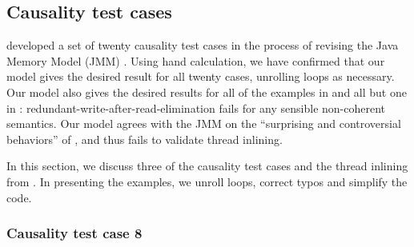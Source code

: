 

\subsection{Causality test cases}
\label{app:tc}

\citet{PughWebsite} developed a set of twenty {causality test cases} in the
process of revising the Java Memory Model (JMM)
\cite{Manson:2005:JMM:1047659.1040336}.  Using hand calculation, we have
confirmed that our model gives the desired result for all twenty cases,
unrolling loops as necessary.  Our model also gives the desired results for
all of the examples in \citet[]{DBLP:conf/esop/BattyMNPS15} and
all but one in \citet[]{SevcikThesis}:
redundant-write-after-read-elimination fails for any
sensible non-coherent semantics.  Our model agrees with the JMM on the
``surprising and controversial behaviors'' of \citet[]{Manson:2005:JMM:1047659.1040336}, and thus fails to validate thread
inlining.

In this section, we discuss three of the causality test cases and the thread
inlining from \cite{Manson:2005:JMM:1047659.1040336}.  In presenting the
examples, we unroll loops, correct typos and simplify the code.  

\subsubsection{Causality test case 8}

